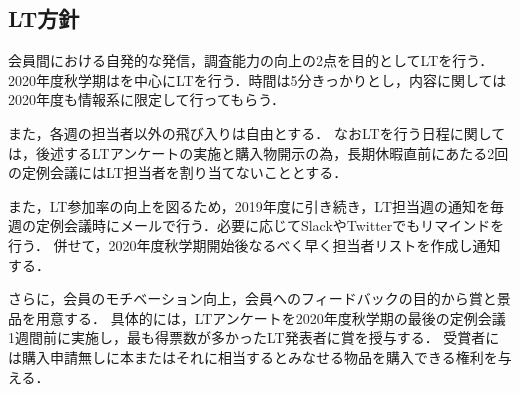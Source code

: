 \subsection*{LT方針}


会員間における自発的な発信，調査能力の向上の2点を目的としてLTを行う．
2020年度秋学期は\firstGrade{}を中心にLTを行う．時間は5分きっかりとし，内容に関しては2020年度も情報系に限定して行ってもらう．

また，各週の担当者以外の飛び入りは自由とする．
なおLTを行う日程に関しては，後述するLTアンケートの実施と購入物開示の為，長期休暇直前にあたる2回の定例会議にはLT担当者を割り当てないこととする．

また，LT参加率の向上を図るため，2019年度に引き続き，LT担当週の通知を毎週の定例会議時にメールで行う．必要に応じてSlackやTwitterでもリマインドを行う．
併せて，2020年度秋学期開始後なるべく早く担当者リストを作成し通知する．

さらに，会員のモチベーション向上，会員へのフィードバックの目的から賞と景品を用意する．
具体的には，LTアンケートを2020年度秋学期の最後の定例会議1週間前に実施し，最も得票数が多かったLT発表者に賞を授与する．
受賞者には購入申請無しに本またはそれに相当するとみなせる物品を購入できる権利を与える．

